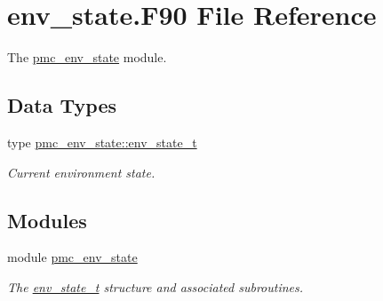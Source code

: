 \hypertarget{env__state_8_f90}{}\section{env\+\_\+state.\+F90 File Reference}
\label{env__state_8_f90}


The \mbox{\hyperlink{namespacepmc__env__state}{pmc\+\_\+env\+\_\+state}} module.  


\subsection*{Data Types}
\begin{DoxyCompactItemize}
\item 
type \mbox{\hyperlink{structpmc__env__state_1_1env__state__t}{pmc\+\_\+env\+\_\+state\+::env\+\_\+state\+\_\+t}}
\begin{DoxyCompactList}\small\item\em Current environment state. \end{DoxyCompactList}\end{DoxyCompactItemize}
\subsection*{Modules}
\begin{DoxyCompactItemize}
\item 
module \mbox{\hyperlink{namespacepmc__env__state}{pmc\+\_\+env\+\_\+state}}
\begin{DoxyCompactList}\small\item\em The \mbox{\hyperlink{structpmc__env__state_1_1env__state__t}{env\+\_\+state\+\_\+t}} structure and associated subroutines. \end{DoxyCompactList}\end{DoxyCompactItemize}
